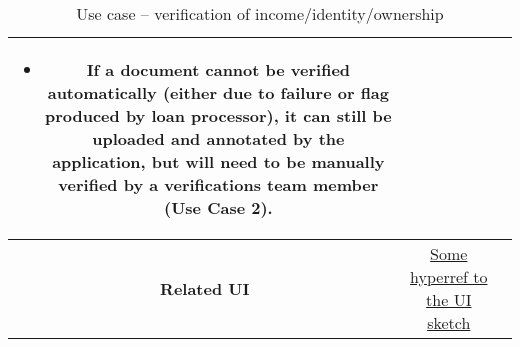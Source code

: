 \begin{table}[H]
\begin{tabularx}{0.75\linewidth}{||Sc|X||}
\begin{minipage}[l]{\linewidth}
            \begin{itemize}[wide, labelindent=0pt]
                \item If a document cannot be verified automatically (either due to failure or flag produced by loan processor), it can still be uploaded and annotated by the application, but will need to be manually verified by a verifications team member (Use Case 2).
            \end{itemize}
        \end{minipage} \\
        \hline
        \textbf{Related UI} & \hyperref[templatesec]{Some hyperref to the UI sketch} \\
        \hline
        \hline
    \end{tabularx}
    \caption{Use case -- verification of income/identity/ownership}
    \label{tab:use_case_fully_processed}
\end{table}
    

